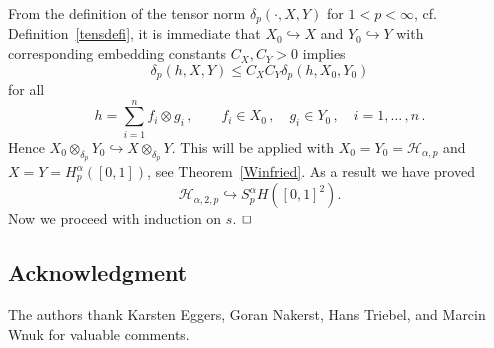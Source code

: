 \documentclass[12pt]{article}
\newtheorem{lemma}{Lemma}
\newenvironment{proof}{\begin{trivlist}
    \item[\hskip\labelsep{\it Proof.}]}{$\hfill\Box$\end{trivlist}}
\newcommand{\HH}{\mathcal{H}}
\newcommand{\N}{\mathbb{N}}
\newcommand{\red}[1]{\textcolor{red}{#1}}
\begin{document}
\begin{proof}[Proof of Corollary~\ref{Winfried2}] 
From the definition of the  tensor norm $\delta_p(\cdot,X,Y)$ for $1<p<\infty$, cf. Definition~\ref{tensdefi}, 
it is immediate that $X_0 \hookrightarrow X$ and 
$Y_0 \hookrightarrow Y$ with corresponding embedding constants $C_X, C_Y>0$ implies %
\[
\delta_p(h,X,Y) \le C_X C_Y \delta_p(h,X_0,Y_0) 
\]
for all
\[
h = \sum_{i=1}^n f_i \otimes g_i\, , \qquad f_i \in X_0\, , \quad g_i \in Y_0\, , 
\quad i=1, \ldots \, ,n\, .
\]
Hence $X_0 \otimes_{\delta_p} Y_0 \hookrightarrow X \otimes_{\delta_p} Y$.
This will be applied with 
$X_0 = Y_0 = \HH_{\alpha,p}$ and  $X= Y= H^\alpha_p ([0,1])$,
see Theorem~\ref{Winfried}.
As a result we have proved 
\[
\HH_{\alpha,2,p} \hookrightarrow S^{\alpha}_{p}H([0,1]^2). 
 \]
Now we proceed with induction on $s$. 
\end{proof}






\subsection*{Acknowledgment}
The authors thank Karsten Eggers, Goran Nakerst, Hans Triebel, and Marcin Wnuk for valuable comments. 
\end{document}
